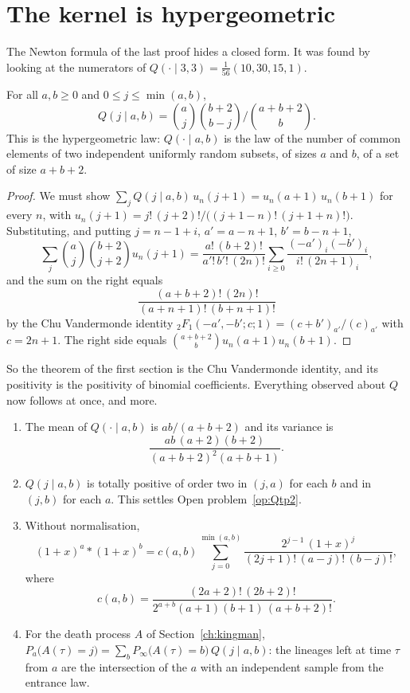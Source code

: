\section{The kernel is hypergeometric}\label{sec:hypergeometric}

The Newton formula of the last proof hides a closed form. It was found by looking at the numerators of $Q(\cdot\mid3,3)=\frac1{56}(10,30,15,1)$.

\begin{theorem}\label{thm:hypergeometric}
For all $a,b\ge0$ and $0\le j\le\min(a,b)$,
\[
Q(j\mid a,b)=\binom aj\binom{b+2}{b-j}\Big/\binom{a+b+2}{b}.
\]
This is the hypergeometric law: $Q(\cdot\mid a,b)$ is the law of the number of common elements of two independent uniformly random subsets, of sizes $a$ and $b$, of a set of size $a+b+2$.
\end{theorem}

\begin{proof}
We must show $\sum_jQ(j\mid a,b)\,u_n(j+1)=u_n(a+1)\,u_n(b+1)$ for every $n$, with $u_n(j+1)=j!\,(j+2)!/\big((j+1-n)!\,(j+1+n)!\big)$. Substituting, and putting $j=n-1+i$, $a'=a-n+1$, $b'=b-n+1$,
\[
\sum_j\binom aj\binom{b+2}{j+2}u_n(j+1)=\frac{a!\,(b+2)!}{a'!\,b'!\,(2n)!}\sum_{i\ge0}\frac{(-a')_i(-b')_i}{i!\,(2n+1)_i},
\]
and the sum on the right equals
\[
\frac{(a+b+2)!\,(2n)!}{(a+n+1)!\,(b+n+1)!}
\]
by the Chu Vandermonde identity ${}_2F_1(-a',-b';c;1)=(c+b')_{a'}/(c)_{a'}$ with $c=2n+1$. The right side equals $\binom{a+b+2}{b}u_n(a+1)u_n(b+1)$.
\end{proof}

So the theorem of the first section is the Chu Vandermonde identity, and its positivity is the positivity of binomial coefficients. Everything observed about $Q$ now follows at once, and more.

\begin{corollary}\label{cor:hypergeometric}
\begin{enumerate}
\item[(i)] The mean of $Q(\cdot\mid a,b)$ is $ab/(a+b+2)$ and its variance is
\[
\frac{ab\,(a+2)(b+2)}{(a+b+2)^2(a+b+1)} .
\]
\item[(ii)] $Q(j\mid a,b)$ is totally positive of order two in $(j,a)$ for each $b$ and in $(j,b)$ for each $a$. This settles Open problem~\ref{op:Qtp2}.
\item[(iii)] Without normalisation,
\[
(1+x)^a*(1+x)^b=c(a,b)\sum_{j=0}^{\min(a,b)}\frac{2^{j-1}\,(1+x)^j}{(2j+1)!\,(a-j)!\,(b-j)!},
\]
where
\[
c(a,b)=\frac{(2a+2)!\,(2b+2)!}{2^{a+b}(a+1)(b+1)\,(a+b+2)!} .
\]
\item[(iv)] For the death process $A$ of Section~\ref{ch:kingman}, $P_a\big(A(\tau)=j\big)=\sum_bP_\infty\big(A(\tau)=b\big)\,Q(j\mid a,b)$: the lineages left at time $\tau$ from $a$ are the intersection of the $a$ with an independent sample from the entrance law.
\end{enumerate}
\end{corollary}

